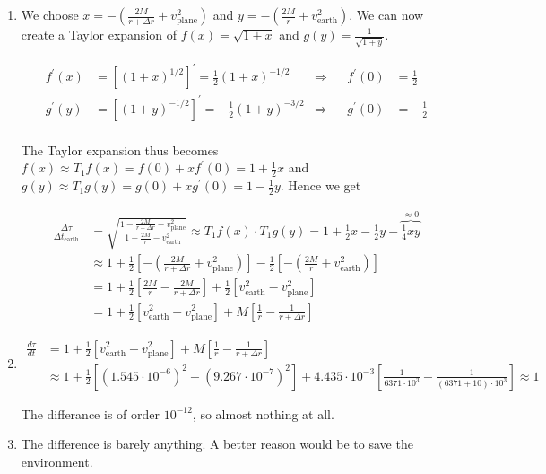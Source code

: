 \documentclass[a4paper,10pt,english]{article}
\begin{document}
\begin{enumerate}
\item We choose $x=-\left(\frac{2M}{r+\Delta r}+v_{\text{plane}}^{2}\right)$ and $y=-\left(\frac{2M}{r}+v_{\text{earth}}^{2}\right)$. We can now create a Taylor expansion of $f(x)=\sqrt{1+x}$ and $g(y)=\frac{1}{\sqrt{1+y}}$.

\begin{align*}
f^{\prime}(x)&=\left[(1+x)^{1/2}\right]^{\prime}=\frac{1}{2}(1+x)^{-1/2} &\Rightarrow&& f^{\prime}(0)&=\frac{1}{2}\\
g^{\prime}(y)&=\left[(1+y)^{-1/2}\right]^{\prime}=-\frac{1}{2}(1+y)^{-3/2} &\Rightarrow&& g^{\prime}(0)&=-\frac{1}{2}\\
\end{align*}

The Taylor expansion thus becomes $f(x)\approx T_{1}f(x)=f(0)+xf^{\prime}(0)=1+\frac{1}{2}x$ and $g(y)\approx T_{1}g(y)=g(0)+xg^{\prime}(0)=1-\frac{1}{2}y$. Hence we get

\begin{align*}
\frac{\Delta\tau}{\Delta t_{\text{earth}}}&=\sqrt{\frac{1-\frac{2M}{r+\Delta r}-v_{\text{plane}}^{2}}{1-\frac{2M}{r}-v_{\text{earth}}^{2}}}\approx T_{1}f(x)\cdot T_{1}g(y)=1+\frac{1}{2}x-\frac{1}{2}y-\overbrace{\frac{1}{4}xy}^{\approx0}\\
&\approx1+\frac{1}{2}\left[-\left(\frac{2M}{r+\Delta r}+v_{\text{plane}}^{2}\right)\right]-\frac{1}{2}\left[-\left(\frac{2M}{r}+v_{\text{earth}}^{2}\right)\right]\\
&=1+\frac{1}{2}\left[\frac{2M}{r}-\frac{2M}{r+\Delta r}\right]+\frac{1}{2}\left[v_{\text{earth}}^{2}-v_{\text{plane}}^{2}\right]\\
&=1+\frac{1}{2}\left[v_{\text{earth}}^{2}-v_{\text{plane}}^{2}\right]+M\left[\frac{1}{r}-\frac{1}{r+\Delta r}\right]
\end{align*}

\item 

\begin{align*}
\frac{d\tau}{dt}&=1+\frac{1}{2}\left[v_{\text{earth}}^{2}-v_{\text{plane}}^{2}\right]+M\left[\frac{1}{r}-\frac{1}{r+\Delta r}\right]\\
&\approx1+\frac{1}{2}\left[(1.545\cdot10^{-6})^{2}-(9.267\cdot10^{-7})^{2}\right]+4.435\cdot10^{-3}\left[\frac{1}{6371\cdot10^{3}}-\frac{1}{(6371+10)\cdot10^{3}}\right]\approx1
\end{align*}

The differance is of order $10^{-12}$, so almost nothing at all.

\item The difference is barely anything. A better reason would be to save the environment.

\end{enumerate}
\end{document}
